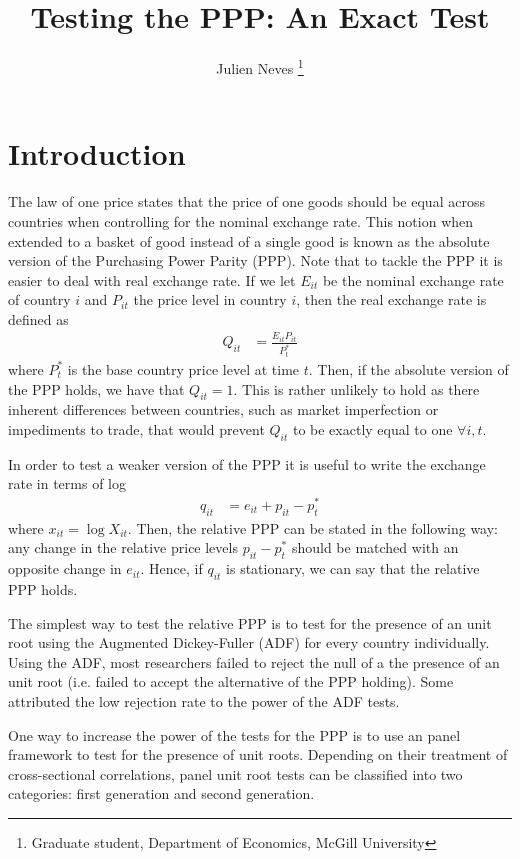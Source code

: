\documentclass[12pt]{article}\usepackage[]{graphicx}\usepackage[]{color}
\title{Testing the PPP: An Exact Test}
\author{Julien Neves \thanks{Graduate student, Department of Economics, McGill University}}
\begin{document}
\maketitle

\section{Introduction}

The law of one price states that the price of one goods should be equal across countries when controlling for the nominal exchange rate. This notion when extended to a basket of good instead of a single good is known as the absolute version of the Purchasing Power Parity (PPP). Note that to tackle the PPP it is easier to deal with real exchange rate. If we let $E_{it}$ be the nominal exchange rate of country $i$ and $P_{it}$ the price level in country $i$, then the real exchange rate is defined as
\begin{align}
	Q_{it} & = \frac{E_{it}P_{it}}{P^*_t}
\end{align}
where $P^*_t$ is the base country price level at time $t$. Then, if the absolute version of the PPP holds, we have that $Q_{it}=1$. This is rather unlikely to hold as there inherent differences between countries, such as market imperfection or impediments to trade, that would prevent $Q_{it}$ to be exactly equal to one $\forall i,t$.

In order to test a weaker version of the PPP it is useful to write the exchange rate in terms of log
\begin{align}
	q_{it} & = e_{it} + p_{it} -p^*_t
\end{align}
where $x_{it}=\log{X_{it}}$. Then, the relative PPP can be stated in the following way: any change in the relative price levels $p_{it} - p^*_t$ should be matched with an opposite change in $e_{it}$. Hence, if $q_{it}$ is stationary, we can say that the relative PPP holds.

The simplest way to test the relative PPP is to test for the presence of an unit root using the Augmented Dickey-Fuller (ADF) for every country individually. Using the ADF, most researchers failed to reject the null of a the presence of an unit root (i.e. failed to accept the alternative of the PPP holding). Some attributed the low rejection rate to the power of the ADF tests.

One way to increase the power of the tests for the PPP is to use an panel framework to test for the presence of unit roots. Depending on their treatment of cross-sectional correlations, panel unit root tests can be classified into two categories: first generation and second generation.
\end{document}
